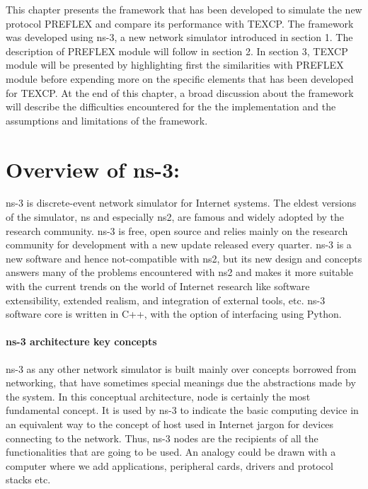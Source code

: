 This chapter presents the framework that has been developed to simulate the new protocol PREFLEX and compare its performance with TEXCP. The framework was developed using ns-3, a new network simulator introduced in section 1. The description of PREFLEX module will follow in section 2. In section 3, TEXCP module will be presented by highlighting first the similarities with PREFLEX module before expending more on the specific elements that has been developed for TEXCP. At the end of this chapter, a broad discussion about the framework will describe the difficulties encountered for the the implementation and the assumptions and limitations of the framework.

\section{Overview of ns-3:}

ns-3 is discrete-event network simulator for Internet systems. The eldest versions of the simulator, ns and especially ns2, are famous and widely adopted by the research community.  ns-3  is free, open source and relies mainly on the research community for development with a new update released every quarter. ns-3 is a new software and hence not-compatible with ns2, but its new design and concepts answers many of the problems encountered with ns2 and makes it more suitable with the current trends on the world of Internet research like software extensibility, extended realism, and integration of external tools, etc.  ns-3 software core is written in C++, with the option of interfacing using Python. 

\paragraph{ns-3 architecture key concepts}

ns-3 as any other network simulator is built mainly over concepts borrowed from networking, that  have sometimes special meanings due the abstractions made by the system. In this conceptual architecture, node is certainly the most fundamental concept. It is used by ns-3 to indicate the basic computing device in an  equivalent way to the concept of host used in Internet jargon for devices connecting to the network. Thus, ns-3 nodes are the recipients of all the functionalities that are going to be used. An analogy could be drawn with a computer where we add applications, peripheral cards, drivers and protocol stacks etc. 

